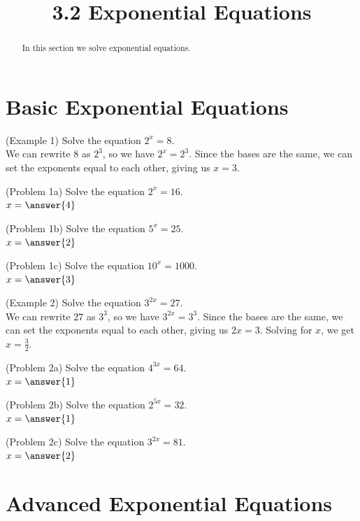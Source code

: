 \documentclass[handout]{ximera}
\title{3.2 Exponential Equations}
\begin{document}
\begin{abstract}
In this section we solve exponential equations.
\end{abstract}

\maketitle


\section{Basic Exponential Equations}

\begin{example}(Example 1)
Solve the equation $2^x = 8$.\\
We can rewrite $8$ as $2^3$, so we have $2^x = 2^3$. 
Since the bases are the same, we can set the exponents equal to each other, giving us $x = 3$.
\end{example}

\begin{problem}(Problem 1a)
Solve the equation $2^x = 16$.\\
  $x = \answer{4}$
\end{problem}

\begin{problem}(Problem 1b)
Solve the equation $5^x = 25$.\\
  $x = \answer{2}$
\end{problem}

\begin{problem}(Problem 1c)
Solve the equation $10^x = 1000$.\\
$x = \answer{3}$
\end{problem}

\begin{example}(Example 2)
Solve the equation $3^{2x} = 27$.\\
    We can rewrite $27$ as $3^3$, so we have $3^{2x} = 3^3$. 
    Since the bases are the same, we can set the exponents equal to each other, giving us $2x = 3$. 
    Solving for $x$, we get $x = \frac{3}{2}$.
\end{example}

\begin{problem}(Problem 2a)
Solve the equation $4^{3x} = 64$.\\
$x = \answer{1}$
\end{problem}

\begin{problem}(Problem 2b)
Solve the equation $2^{5x} = 32$.\\
$x = \answer{1}$
\end{problem}

\begin{problem}(Problem 2c)
Solve the equation $3^{2x} = 81$.\\
$x = \answer{2}$
\end{problem}

\section{Advanced Exponential Equations}
\end{document}
